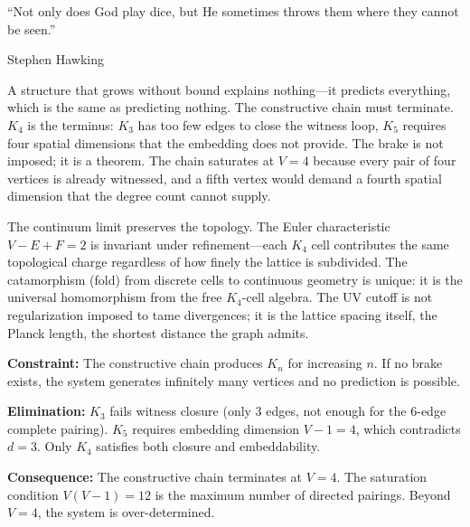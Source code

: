 \documentclass[11pt,a4paper]{book}
\begin{document}
\epigraph{``Not only does God play dice, but He sometimes throws them where they cannot be seen.''}{Stephen Hawking}

A structure that grows without bound explains nothing---it predicts everything, which is the same as predicting nothing. The constructive chain must terminate. $K_4$ is the terminus: $K_3$ has too few edges to close the witness loop, $K_5$ requires four spatial dimensions that the embedding does not provide. The brake is not imposed; it is a theorem. The chain saturates at $V = 4$ because every pair of four vertices is already witnessed, and a fifth vertex would demand a fourth spatial dimension that the degree count cannot supply.

The continuum limit preserves the topology. The Euler characteristic $V - E + F = 2$ is invariant under refinement---each $K_4$ cell contributes the same topological charge regardless of how finely the lattice is subdivided. The catamorphism (fold) from discrete cells to continuous geometry is unique: it is the universal homomorphism from the free $K_4$-cell algebra. The UV cutoff is not regularization imposed to tame divergences; it is the lattice spacing itself, the Planck length, the shortest distance the graph admits.

\textbf{Constraint:} The constructive chain produces $K_n$ for increasing $n$. If no brake exists, the system generates infinitely many vertices and no prediction is possible.

\textbf{Elimination:} $K_3$ fails witness closure (only 3 edges, not enough for the 6-edge complete pairing). $K_5$ requires embedding dimension $V - 1 = 4$, which contradicts $d = 3$. Only $K_4$ satisfies both closure and embeddability.

\textbf{Consequence:} The constructive chain terminates at $V = 4$. The saturation condition $V(V-1) = 12$ is the maximum number of directed pairings. Beyond $V = 4$, the system is over-determined.
\end{document}

